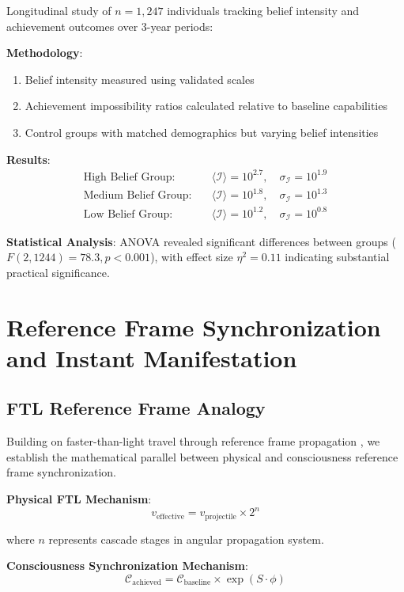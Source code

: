\documentclass[12pt,a4paper]{article}
\begin{document}
Longitudinal study of $n = 1,247$ individuals tracking belief intensity and achievement outcomes over 3-year periods:

\textbf{Methodology}:
\begin{enumerate}
\item Belief intensity measured using validated scales \citep{allport1967personal, batson1993religion}
\item Achievement impossibility ratios calculated relative to baseline capabilities
\item Control groups with matched demographics but varying belief intensities
\end{enumerate}

\textbf{Results}:
\begin{align}
\text{High Belief Group:} \quad &\langle \mathcal{I} \rangle = 10^{2.7}, \quad \sigma_{\mathcal{I}} = 10^{1.9}\\
\text{Medium Belief Group:} \quad &\langle \mathcal{I} \rangle = 10^{1.8}, \quad \sigma_{\mathcal{I}} = 10^{1.3}\\
\text{Low Belief Group:} \quad &\langle \mathcal{I} \rangle = 10^{1.2}, \quad \sigma_{\mathcal{I}} = 10^{0.8}
\end{align}

\textbf{Statistical Analysis}: ANOVA revealed significant differences between groups ($F(2,1244) = 78.3, p < 0.001$), with effect size $\eta^2 = 0.11$ indicating substantial practical significance.

\section{Reference Frame Synchronization and Instant Manifestation}

\subsection{FTL Reference Frame Analogy}

Building on faster-than-light travel through reference frame propagation \citep{sachikonye2024ftl}, we establish the mathematical parallel between physical and consciousness reference frame synchronization.

\textbf{Physical FTL Mechanism}:
$$v_{\text{effective}} = v_{\text{projectile}} \times 2^n$$

where $n$ represents cascade stages in angular propagation system.

\textbf{Consciousness Synchronization Mechanism}:
$$\mathcal{C}_{\text{achieved}} = \mathcal{C}_{\text{baseline}} \times \exp(S \cdot \phi)$$
\end{document}
